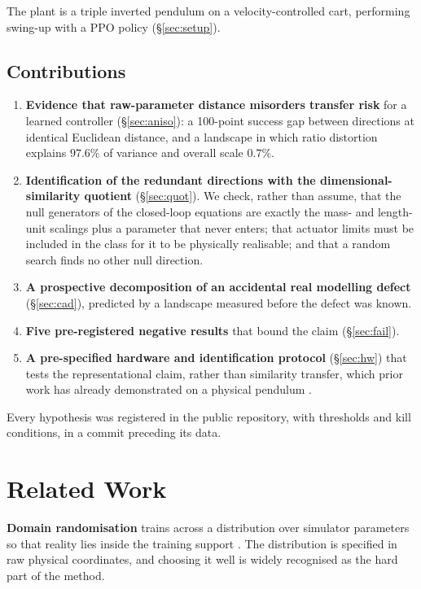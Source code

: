 \documentclass[conference]{IEEEtran}
\begin{document}
The plant is a triple inverted pendulum on a velocity-controlled cart,
performing swing-up with a PPO policy (\S\ref{sec:setup}).

\subsection*{Contributions}
\begin{enumerate}
\item \textbf{Evidence that raw-parameter distance misorders transfer risk}
for a learned controller (\S\ref{sec:aniso}): a 100-point success gap between
directions at identical Euclidean distance, and a landscape in which ratio
distortion explains $97.6\%$ of variance and overall scale $0.7\%$.
\item \textbf{Identification of the redundant directions with the
dimensional-similarity quotient} (\S\ref{sec:quot}). We check, rather than
assume, that the null generators of the closed-loop equations are exactly the
mass- and length-unit scalings plus a parameter that never enters; that
actuator limits must be included in the class for it to be physically
realisable; and that a random search finds no other null direction.
\item \textbf{A prospective decomposition of an accidental real modelling
defect} (\S\ref{sec:cad}), predicted by a landscape measured before the defect
was known.
\item \textbf{Five pre-registered negative results} that bound the claim
(\S\ref{sec:fail}).
\item \textbf{A pre-specified hardware and identification protocol}
(\S\ref{sec:hw}) that tests the representational claim, rather than similarity
transfer, which prior work has already demonstrated on a physical pendulum
\cite{pascoa2025}.
\end{enumerate}

Every hypothesis was registered in the public repository, with thresholds and
kill conditions, in a commit preceding its data.

\section{Related Work}

\textbf{Domain randomisation} trains across a distribution over simulator
parameters so that reality lies inside the training support
\cite{tobin2017,peng2018,openai2020}. The distribution is specified in raw
physical coordinates, and choosing it well is widely recognised as the hard
part of the method.
\end{document}

